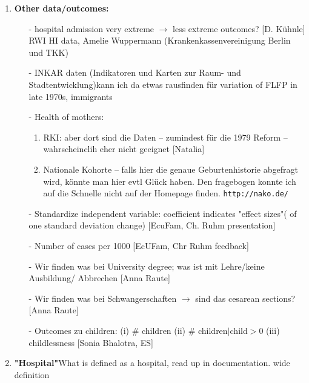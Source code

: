 \documentclass[11pt,a4paper]{article}
\begin{document}
{\begin{enumerate}
\item \textbf{Other data/outcomes:}\vspace{-1 em}
\begin{itemize}
	\item[-] hospital admission very extreme $\rightarrow$ less extreme outcomes? [D. Kühnle] RWI HI data, Amelie Wuppermann (Krankenkassenvereinigung Berlin und TKK)
	\item[-] INKAR daten (Indikatoren und Karten zur Raum- und Stadtentwicklung)\newline kann ich da etwas rausfinden für variation of FLFP in late 1970s, immigrants 
	\item[-] Health of mothers: \vspace{-.5em}
	\begin{enumerate}
		\item RKI: aber dort sind die Daten – zumindest für die 1979 Reform – wahrscheinclih eher nicht geeignet [Natalia]
		\item  Nationale Kohorte – falls hier die genaue Geburtenhistorie abgefragt wird, könnte man hier evtl Glück haben. Den fragebogen konnte ich auf die Schnelle nicht auf der Homepage finden. \texttt{http://nako.de/}
	\end{enumerate}
	\item[-] Standardize independent variable: coefficient indicates "effect sizes"( of one standard deviation change) [EcuFam, Ch. Ruhm presentation]
	\item[-] Number of cases  per 1000 [EcUFam, Chr Ruhm feedback] 
	\item[-] Wir finden was bei University degree; was ist mit Lehre/keine Ausbildung/ Abbrechen [Anna Raute]
	\item[-] Wir finden was bei Schwangerschaften $\rightarrow$ sind das cesarean sections? [Anna Raute]
	\item[-] Outcomes zu children: (i) \#  children (ii) \# children$|$child$>$0 (iii) childlessness [Sonia Bhalotra, ES]
\end{itemize}


\item \textbf{"Hospital"}\newline What is defined as a hospital, read up in documentation. wide definition



\end{enumerate}}
\end{document}

